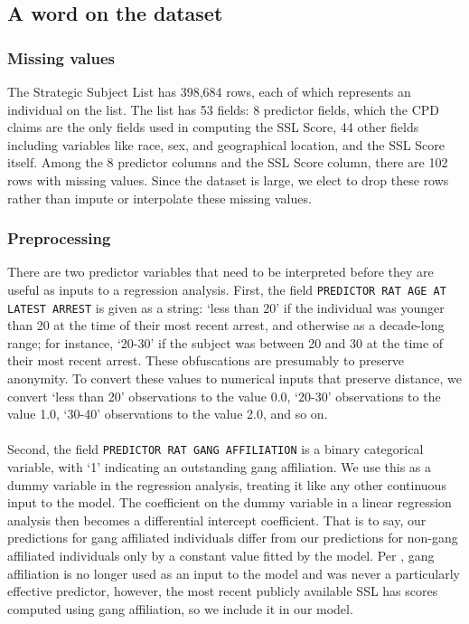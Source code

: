\subsection{A word on the dataset}
\subsubsection{Missing values}
The Strategic Subject List has 398,684 rows, each of which represents an individual on the list. The list has 53 fields: 8 predictor fields, which the CPD claims are the only fields used in computing the SSL Score, 44 other fields including variables like race, sex, and geographical location, and the SSL Score itself. Among the 8 predictor columns and the SSL Score column, there are 102 rows with missing values. Since the dataset is large, we elect to drop these rows rather than impute or interpolate these missing values.
\subsubsection{Preprocessing}
There are two predictor variables that need to be interpreted before they are useful as inputs to a regression analysis. First, the field \texttt{PREDICTOR RAT AGE AT LATEST ARREST} is given as a string: ‘less than 20’ if the individual was younger than 20 at the time of their most recent arrest, and otherwise as a decade-long range; for instance, ‘20-30’ if the subject was between 20 and 30 at the time of their most recent arrest. These obfuscations are presumably to preserve anonymity. To convert these values to numerical inputs that preserve distance, we convert ‘less than 20’ observations to the value 0.0, ‘20-30’ observations to the value 1.0, ‘30-40’ observations to the value 2.0, and so on.\\\\
Second, the field \texttt{PREDICTOR RAT GANG AFFILIATION} is a binary categorical variable, with ‘1’ indicating an outstanding gang affiliation. We use this as a dummy variable in the regression analysis, treating it like any other continuous input to the model. The coefficient on the dummy variable in a linear regression analysis then becomes a differential intercept coefficient. That is to say, our predictions for gang affiliated individuals differ from our predictions for non-gang affiliated individuals only by a constant value fitted by the model. Per \cite{upturn}, gang affiliation is no longer used as an input to the model and was never a particularly effective predictor, however, the most recent publicly available SSL has scores computed using gang affiliation, so we include it in our model.
